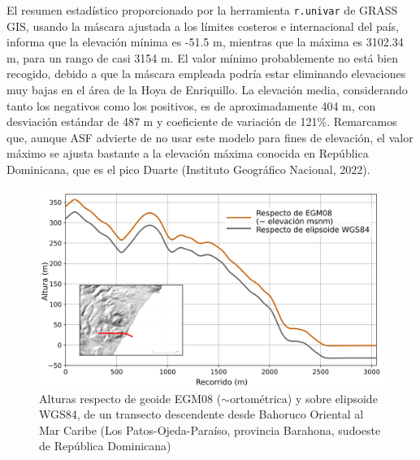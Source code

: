 \documentclass[spanish]{article}
\begin{document}
El resumen estadístico proporcionado por la herramienta
\texttt{r.univar} de GRASS GIS, usando la máscara ajustada a los límites
costeros e internacional del país, informa que la elevación mínima es
-51.5 m, mientras que la máxima es 3102.34 m, para un rango de casi 3154
m. El valor mínimo probablemente no está bien recogido, debido a que la
máscara empleada podría estar eliminando elevaciones muy bajas en el
área de la Hoya de Enriquillo. La elevación media, considerando tanto
los negativos como los positivos, es de aproximadamente 404 m, con
desviación estándar de 487 m y coeficiente de variación de 121\%.
Remarcamos que, aunque ASF advierte de no usar este modelo para fines de
elevación, el valor máximo se ajusta bastante a la elevación máxima
conocida en República Dominicana, que es el pico Duarte (Instituto
Geográfico Nacional, 2022).

\begin{figure}

{\centering \includegraphics[width=1\linewidth]{figuras/perfiles-dem/los-patos} 

}

\caption{Alturas respecto de geoide EGM08 ($\sim$ortométrica) y sobre elipsoide WGS84, de un transecto descendente desde Bahoruco Oriental al Mar Caribe (Los Patos-Ojeda-Paraíso, provincia Barahona, sudoeste de República Dominicana)}\label{fig:alturasgeoideelipsoide}
\end{figure}
\end{document}
